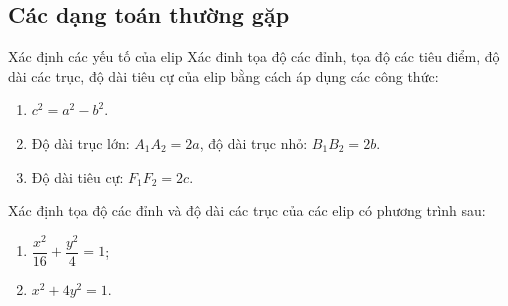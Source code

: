 \subsection{Các dạng toán thường gặp}
\begin{dang}{Xác định các yếu tố của elip}
	Xác đinh tọa độ các đỉnh, tọa độ các tiêu điểm, độ dài các trục, độ dài tiêu cự của elip bằng cách áp dụng các công thức:
	\begin{enumerate}
		\item $c^2 = a^2 - b^2$.
		\item Độ dài trục lớn: $A_1 A_2 = 2a$, độ dài trục nhỏ: $B_1 B_2 = 2b$.
		\item Độ dài tiêu cự: $F_1 F_2 = 2c$.
	\end{enumerate}
\end{dang}
\begin{vd}%
	Xác định tọa độ các đỉnh và độ dài các trục của các elip có phương trình sau:\\
	\begin{multicols}{2}
		\begin{enumerate}
			\item $\dfrac{x^2}{16}+\dfrac{y^2}{4}=1$;
			\item $x^2+4y^2=1$.
		\end{enumerate}
	\end{multicols}
\end{vd}

